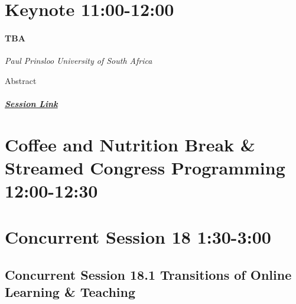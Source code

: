 \documentclass[
]{book}
\begin{document}
\hypertarget{keynote-1100-1200-2}{%
\section*{Keynote \textbar{} 11:00-12:00}\label{keynote-1100-1200-2}}

\begin{keynote}
\hypertarget{tba}{%
\paragraph*{TBA}\label{tba}}

\emph{Paul Prinsloo} \emph{University of South Africa}

Abstract

\hypertarget{session-link}{%
\subparagraph*{\texorpdfstring{\href{}{Session
Link}}{Session Link}}\label{session-link}}
\end{keynote}

\hypertarget{coffee-and-nutrition-break-streamed-congress-programming-1200-1230-1}{%
\section*{Coffee and Nutrition Break \& Streamed Congress Programming \textbar{} 12:00-12:30}\label{coffee-and-nutrition-break-streamed-congress-programming-1200-1230-1}}

\hypertarget{concurrent-session-18-130-300}{%
\section*{Concurrent Session 18 \textbar{} 1:30-3:00}\label{concurrent-session-18-130-300}}

\hypertarget{concurrent-session-18.1-transitions-of-online-learning-teaching}{%
\subsection*{Concurrent Session 18.1 \textbar{} Transitions of Online Learning \& Teaching}\label{concurrent-session-18.1-transitions-of-online-learning-teaching}}
\end{document}
